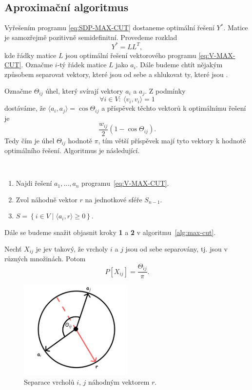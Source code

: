 \subsection{Aproximační algoritmus}

Vyřešením programu \ref{eq:SDP-MAX-CUT} dostaneme optimální řešení $Y^*$. Matice je samozřejmě pozitivně semidefinitní. Provedeme rozklad
$$
    Y^* = LL^T,
$$
kde řádky matice $L$ jsou optimální řešení vektorového programu \ref{eq:V-MAX-CUT}. Označme $i$-tý řádek matice $L$ jako $a_i$. Dále budeme chtít nějakým způsobem separovat vektory, které jsou od sebe  a shlukovat ty, které jsou .

Označme $\Theta_{ij}$ úhel, který svírají vektory $a_i$ a $a_j$. Z podmínky
$$
    \forall i \in V:\ \langle v_i, v_i \rangle = 1
$$
dostáváme, že $\langle a_i, a_j \rangle = \cos \Theta_{ij}$ a příspěvek těchto vektorů k optimálnímu řešení je
$$
    \frac{w_{ij}}{2} (1 - \cos \Theta_{ij}).
$$
Tedy čím  je úhel $\Theta_{ij}$ hodnotě $\pi$, tím větší příspěvek mají tyto vektory k hodnotě optimálního řešení. Algoritmus je následující.

\begin{alg}\cite{max-cut}$ $
    \begin{enumerate}
        \item Najdi řešení $a_1, \dots, a_n$ programu~\ref{eq:V-MAX-CUT}.
        \item Zvol náhodně vektor $r$ na jednotkové sféře $S_{n-1}$.
        \item $S = \left\{ i \in V \mid \langle a_i, r \rangle \geq 0 \right\}$.
    \end{enumerate}
    \label{alg:max-cut}
\end{alg}

Dále se budeme snažit objasnit kroky \textbf{1} a \textbf{2} v algoritmu~\ref{alg:max-cut}.

\begin{lm}\cite{shannon-capacity-lower-bound-on-c7-worst}
    Nechť $X_{ij}$ je jev takový, že vrcholy $i$ a $j$ jsou od sebe separovány, tj. jsou v různých množinách. Potom
    $$
        P\left[ X_{ij} \right] = \frac{\Theta_{ij}}{\pi}.
    $$
    \label{lemma:sep}
\end{lm}

\begin{figure}[h!]
    \centering
    \includegraphics[width=0.5\textwidth]{img/lemma_plane.png}   
    \caption{Separace vrcholů $i$, $j$ náhodným vektorem $r$.}
    \label{fig:lemma_plane}
\end{figure}

